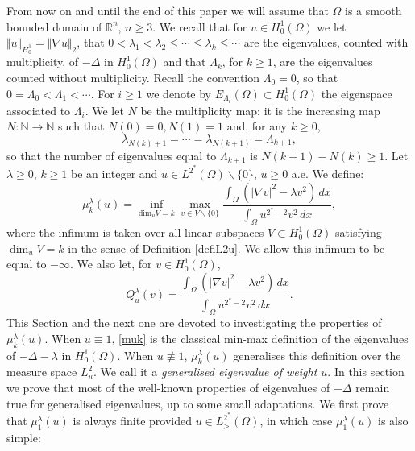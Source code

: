 \documentclass[10pt]{amsart}
\numberwithin{equation}{section}
\newcommand{\R}{\mathbb{R}}
\newcommand{\Om}{\Omega}
\newcommand{\mkl}{\mu_{k}^{\lambda}}
\theoremstyle{plain}
\theoremstyle{remark}
\begin{document}
\medskip


From now on and until the end of this paper we will assume that $\Om$ is a smooth bounded domain of $\R^n$, $n \ge 3$. We recall that for $u \in H^1_0(\Om)$ we let $\Vert u \Vert_{H^1_0} = \Vert \nabla u \Vert_{2}$, that $0< \lambda_1 < \lambda_2 \le \cdots \le \lambda_k \le \cdots$ are the eigenvalues, counted with multiplicity,  of $-\Delta$ in $H^1_0(\Om)$ and that  $\Lambda_k$, for $k \ge 1$, are the eigenvalues counted without multiplicity. Recall the convention $\Lambda_0 = 0$, so that $ 0  =  \Lambda_0  < \Lambda_1  <  \cdots$. For $i \ge 1$ we denote by $E_{\Lambda_i}(\Om) \subset H^1_0(\Om)$ the eigenspace associated to $\Lambda_i$. We let $N$ be the multiplicity map: it is the increasing map $N: \mathbb{N} \to \mathbb{N}$ such that $N(0) = 0, N(1) = 1$ and, for any $k \ge 0$, 
\begin{equation} \label{defN} 
\lambda_{N(k) +1} = \cdots = \lambda_{N(k+1)} = \Lambda_{k+1},
\end{equation}
so that the number of eigenvalues equal to $\Lambda_{k+1}$ is $N(k+1) - N(k) \ge 1$. Let $\lambda \ge0$, $k \ge 1$ be an integer and $u \in L^{2^*}(\Om)\backslash \{0\}$, $u \ge 0$ a.e. We define:
\begin{equation} \label{muk}
\mkl(u) = \inf_{\text{dim}_u V = k} \max_{v \in V \backslash \{0\}} \frac{\int_{\Om}\left(  |\nabla v|^2 - \lambda v^2 \right) \, dx}{\int_{\Om} u^{2^*-2} v^2 \, dx},
\end{equation}
where the infimum is taken over all linear subspaces $V \subset H^1_0(\Om)$ satisfying $\dim_u V = k$ in the sense of Definition \ref{defiL2u}. We allow this infimum to be equal to $- \infty$. We also let, for  $v \in H^1_0(\Om)$, 
\begin{equation} \label{defQu}
Q_u^{\lambda}(v) = \frac{\int_{\Om}\left(  |\nabla v|^2 - \lambda v^2 \right) \, dx}{\int_{\Om} u^{2^*-2} v^2 \, dx}.
\end{equation}
This Section and the next one are devoted to investigating the properties of $\mkl(u)$. When $u \equiv 1$, \eqref{muk} is the classical min-max definition of the eigenvalues of $- \Delta- \lambda$ in $H^1_0(\Om)$. When $u \not \equiv 1$, $\mkl(u)$ generalises this definition over the measure space $L^{2}_u$. We call it a \emph{generalised eigenvalue of weight $u$}. In this section we prove that most of the well-known properties of eigenvalues of $-\Delta$ remain true for generalised eigenvalues, up to some small adaptations. We first prove that $\mu_1^{\lambda}(u)$ is always finite provided $u \in L^{2^*}_{>}(\Om)$, in which case $\mu_1^\lambda(u)$ is also simple: 
\end{document}
